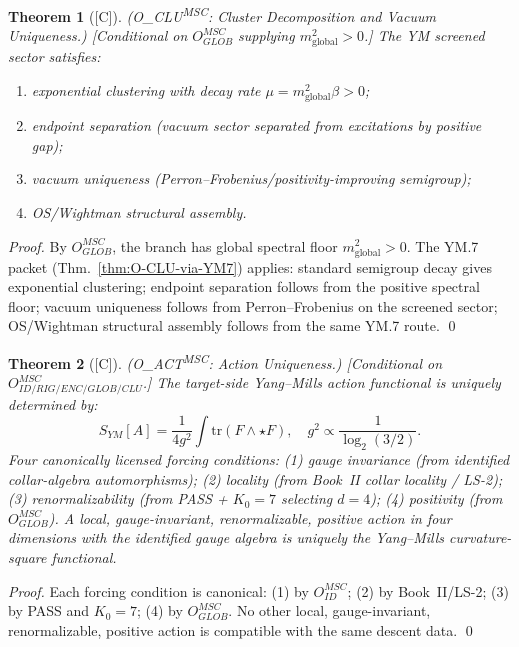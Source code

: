 \documentclass[12pt,oneside]{amsbook}
\theoremstyle{plain}
\newtheorem{theorem}{Theorem}[section]
\theoremstyle{definition}
\theoremstyle{remark}
\newcommand{\status}[1]{\textup{[#1]}}
\begin{document}
\begin{theorem}[\status{C}]\label{thm:YM-CLU-MSC}
\textup{(O\_{CLU}\textsuperscript{MSC}: Cluster Decomposition and Vacuum Uniqueness.)}
\textup{[Conditional on $O_{GLOB}^{MSC}$ supplying $m^2_{\mathrm{global}} > 0$.]}
The YM screened sector satisfies:
\begin{enumerate}[label=\textup{(\arabic*)}]
 \item exponential clustering with decay rate $\mu = m^2_{\mathrm{global}} \beta > 0$;
 \item endpoint separation (vacuum sector separated from excitations by positive gap);
 \item vacuum uniqueness (Perron--Frobenius/positivity-improving semigroup);
 \item OS/Wightman structural assembly.
\end{enumerate}
\end{theorem}

\begin{proof}
By $O_{GLOB}^{MSC}$, the branch has global spectral floor
$m^2_{\mathrm{global}} > 0$. The YM.7 packet (Thm.~\ref{thm:O-CLU-via-YM7})
applies: standard semigroup decay gives exponential clustering;
endpoint separation follows from the positive spectral floor; vacuum
uniqueness follows from Perron--Frobenius on the screened sector;
OS/Wightman structural assembly follows from the same YM.7 route.
\qed
\end{proof}

\begin{theorem}[\status{C}]\label{thm:YM-ACT-MSC}
\textup{(O\_{ACT}\textsuperscript{MSC}: Action Uniqueness.)}
\textup{[Conditional on $O_{ID/RIG/ENC/GLOB/CLU}^{MSC}$.]}
The target-side Yang--Mills action functional is uniquely determined by:
\[
 S_{YM}[A] = \frac{1}{4g^2}\int \mathrm{tr}(F \wedge \star F),
 \quad g^2 \propto \frac{1}{\log_2(3/2)}.
\]
Four canonically licensed forcing conditions:
\textup{(1)} gauge invariance (from identified collar-algebra automorphisms);
\textup{(2)} locality (from Book~II collar locality / LS-2);
\textup{(3)} renormalizability (from PASS + $K_0=7$ selecting $d=4$);
\textup{(4)} positivity (from $O_{GLOB}^{MSC}$).
A local, gauge-invariant, renormalizable, positive action in four
dimensions with the identified gauge algebra is uniquely the
Yang--Mills curvature-square functional.
\end{theorem}

\begin{proof}
Each forcing condition is canonical: (1) by $O_{ID}^{MSC}$; (2) by
Book~II/LS-2; (3) by PASS and $K_0=7$; (4) by $O_{GLOB}^{MSC}$.
No other local, gauge-invariant, renormalizable, positive action
is compatible with the same descent data.
\qed
\end{proof}
\end{document}
